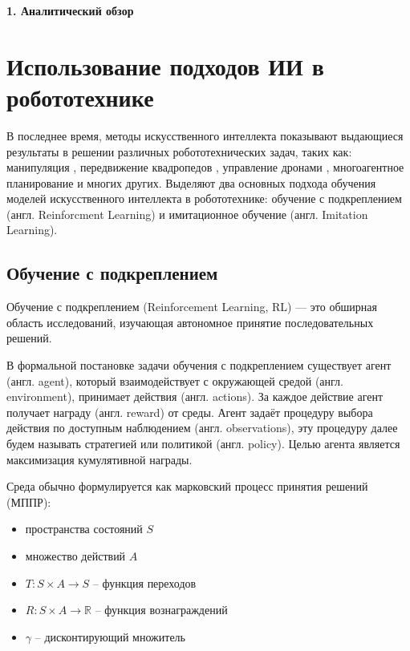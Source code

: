 \newpage
\begin{center}
  \textbf{\large 1. Аналитический обзор }
\end{center}

\section{Использование подходов ИИ в робототехнике}

    В последнее время, методы искусственного интеллекта показывают выдающиеся результаты в решении различных робототехнических задач, таких как: манипуляция \cite{related-manipulation-1, related-manipulation-2}, передвижение квадропедов \cite{related-locomotion-1, related-locomotion-2}, управление дронами \cite{related-drone-1, related-drone-2}, многоагентное планирование \cite{related-multi-agent-1, related-multi-agent-2} и многих других. Выделяют два основных подхода обучения моделей искусственного интеллекта в робототехнике: обучение с подкреплением (англ. Reinforcment Learning) и имитационное обучение (англ. Imitation Learning). 

    \subsection{Обучение с подкреплением}

        Обучение с подкреплением (Reinforcement Learning, RL) — это обширная область исследований, изучающая автономное принятие последовательных решений.

        В формальной постановке задачи обучения с подкреплением существует агент (англ. agent), который взаимодействует с окружающей средой (англ. environment), принимает действия (англ. actions). За каждое действие агент получает награду (англ. reward) от среды. Агент задаёт процедуру выбора действия по доступным наблюдением (англ. observations), эту процедуру далее будем называть стратегией или политикой (англ. policy). Целью агента является максимизация кумулятивной награды. 
        
        Среда обычно формулируется как марковский процесс принятия решений (МППР):

        \begin{itemize}
            \item пространства состояний $S$ 
            \item множество действий $A$
            \item $T: S \times A \to S$ -- функция переходов
            \item $R: S \times A \to \mathbb{R}$  -- функция вознаграждений
            \item $\gamma$ -- дисконтирующий множитель
        \end{itemize}


